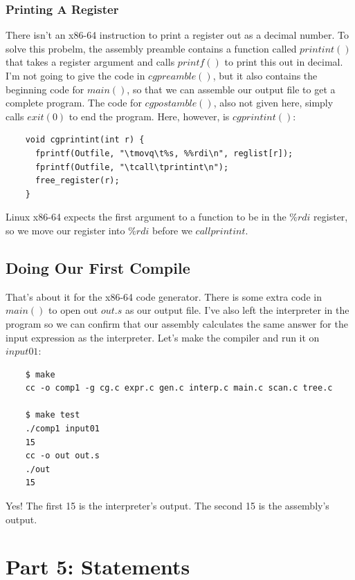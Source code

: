 \documentclass[journal, onecolumn, 12pt]{IEEEtran}
\begin{document}
\subsubsection{Printing A Register}

There isn't an x86-64 instruction to print a register out as a decimal number. To solve this probelm, the assembly preamble contains a function called $printint()$ that takes a register argument and calls $printf()$ to print this out in decimal.
I'm not going to give the code in $cgpreamble()$, but it also contains the beginning code for $main()$, so that we can assemble our output file to get a complete program. The code for $cgpostamble()$, also not given here, simply calls $exit(0)$ to end the program. Here, however, is $cgprintint()$:

\begin{lstlisting}
    void cgprintint(int r) {
      fprintf(Outfile, "\tmovq\t%s, %%rdi\n", reglist[r]);
      fprintf(Outfile, "\tcall\tprintint\n");
      free_register(r);
    }
\end{lstlisting}

Linux x86-64 expects the first argument to a function to be in the $\%rdi$ register, so we move our register into $\%rdi$ before we $call printint$.

\subsection{Doing Our First Compile}

That's about it for the x86-64 code generator. There is some extra code in $main()$ to open out $out.s$ as our output file. I've also left the interpreter in the program so we can confirm that our assembly calculates the same answer for the input expression as the interpreter. Let's make the compiler and run it on $input 01$:

\begin{lstlisting}
    $ make
    cc -o comp1 -g cg.c expr.c gen.c interp.c main.c scan.c tree.c
    
    $ make test
    ./comp1 input01
    15
    cc -o out out.s
    ./out
    15
\end{lstlisting}

Yes! The first 15 is the interpreter's output. The second 15 is the assembly's output.

\section{Part 5: Statements}
\end{document}
